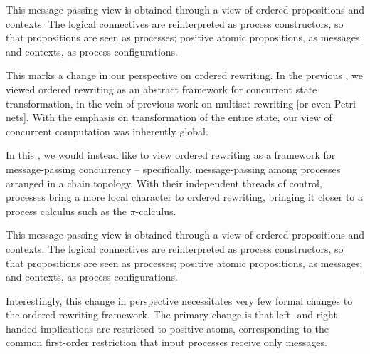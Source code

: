 This message-passing view is obtained through a \autocite{??} view of ordered propositions and contexts.
The logical connectives are reinterpreted as process constructors, so that propositions are seen as processes; positive atomic propositions, as messages; and contexts, as process configurations.



This  marks a change in our perspective on ordered rewriting.
In the previous , we viewed ordered rewriting as an abstract framework for concurrent state transformation, in the vein of previous work on multiset rewriting\autocite{??} [or even Petri nets\autocite{??}].
With the emphasis on transformation of the entire state, our view of concurrent computation was inherently global.

In this , we would instead like to view ordered rewriting as a framework for message-passing concurrency -- specifically, message-passing among processes arranged in a chain topology.
With their independent threads of control, processes bring a more local character to ordered rewriting, bringing it closer to a process calculus such as the $\pi$-calculus.

This message-passing view is obtained through a \autocite{??} view of ordered propositions and contexts.
The logical connectives are reinterpreted as process constructors, so that propositions are seen as processes; positive atomic propositions, as messages; and contexts, as process configurations.




Interestingly, this change in perspective necessitates very few formal changes to the ordered rewriting framework.
The primary change is that left- and right-handed implications are restricted to positive atoms, corresponding to the common first-order restriction that input processes receive only messages.

